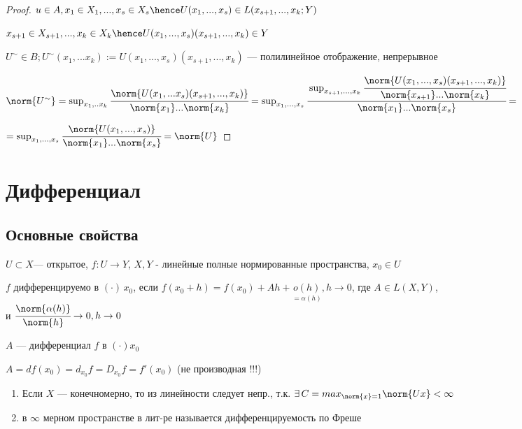 \begin{proof}
    $u \in A, x_1 \in X_1, ..., x_s \in X_s \hence U(x_1, ..., x_s) \in L(x_{s + 1}, ..., x_k; Y)$

    $x_{s + 1} \in X_{s + 1}, ..., x_k \in X_k \hence U(x_1,..., x_s)(x_{s + 1}, ..., x_{k}) \in Y$
    
    $U^{\sim} \in B;  U^{\sim} (x_1, ... x_k) := U(x_1, ..., x_s)(x_{s + 1}, ..., x_k)$ --- полилинейное отображение, непрерывное

    $\norm{U^\sim} = \sup_{x_1,..x_k} \cfrac{\norm{U(x_1, ... x_s)(x_{s+1}, ..., x_k)}}{\norm{x_1} ... \norm{x_k}} = \sup_{x_1, ..., x_s} \cfrac{ \sup_{x_{s+1}, ..., x_k} \cfrac{\norm{U(x_1, ..., x_s)(x_{s + 1}, ... , x_k)}}{\norm{x_{s + 1}} ... \norm{x_k}}}{\norm{x_1} ... \norm{x_s}} =$

    $ = \sup_{x_1,..., x_s}{\cfrac{\norm{U(x_1,...,x_s)}}{\norm{x_1} ... \norm{x_s}}} = \norm{U}$
\end{proof}


\section{Дифференциал}
\subsection{Основные свойства}
\begin{definition}
    $U \subset X$--- открытое, $f : U \to Y$, $X, Y$ - линейные полные нормированные пространства, $x_0 \in U$
    

    $f$ дифференцируемо в $(\cdot)\, x_0$, если $f(x_0 + h) = f(x_0) + Ah + \underset{ = \alpha(h)}{o(h)}, h \to 0$, где $A \in L(X, Y)$, \\ и $\cfrac{\norm{\alpha(h)}}{\norm{h}} \to 0, h \to 0$

    $A$ --- дифференциал $f$ в $(\cdot) x_0$

    $A = df(x_0) = d_{x_0}f = D_{x_0}f = f'(x_0)$ (не производная !!!)
\end{definition}


\newpage

\begin{remark}

\quad

\begin{enumerate}
    \item  Если $X$ --- конечномерно, то из линейности следует непр., т.к. $\exists \, C = max_{\norm{x} = 1} \norm{Ux} < \infty$
    \item \begin{definition}
        в $\infty$ мерном пространстве в лит-ре называется дифференцируемость по Фреше
    \end{definition}
\end{enumerate}
   
\end{remark}

